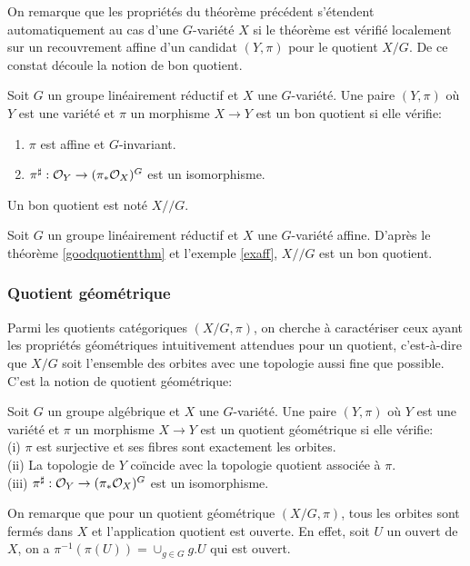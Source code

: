 On remarque que les propriétés du théorème précédent s'étendent automatiquement au cas d'une $G$-variété $X$ si le théorème est vérifié localement sur un recouvrement affine d'un candidat $(Y,\pi)$ pour le quotient $X/G$. De ce constat découle la notion de bon quotient.

\begin{defn}
Soit $G$ un groupe linéairement réductif et $X$ une $G$-variété. Une paire $(Y, \pi)$ où $Y$ est une variété et $\pi$ un morphisme $X\rightarrow Y$ est un bon quotient si elle vérifie:
\begin{enumerate}
\item $\pi$ est affine et $G$-invariant.
\item $\pi^\sharp:\mathcal{O}_Y \rightarrow (\pi_*\mathcal{O}_X)^G$ est un isomorphisme.
\end{enumerate}
Un bon quotient est noté $X//G$.
\end{defn}

\begin{ex}
Soit $G$ un groupe linéairement réductif et $X$ une $G$-variété affine. D'après le théorème \ref{goodquotientthm} et l'exemple \ref{exaff}, $X//G$ est un bon quotient.
\end{ex}


\subsubsection{Quotient géométrique}

Parmi les quotients catégoriques $(X/G,\pi)$, on cherche à caractériser ceux ayant les propriétés géométriques intuitivement attendues pour un quotient, c'est-à-dire que $X/G$ soit l'ensemble des orbites avec une topologie aussi fine que possible. C'est la notion de quotient géométrique:

\begin{defn}
Soit $G$ un groupe algébrique et $X$ une $G$-variété. Une paire $(Y, \pi)$ où $Y$ est une variété et $\pi$ un morphisme $X\rightarrow Y$ est un quotient géométrique si elle vérifie:\\
(i) $\pi$ est surjective et ses fibres sont exactement les orbites.\\
(ii) La topologie de $Y$ coïncide avec la topologie quotient associée à $\pi$.\\
(iii) $\pi^\sharp:\mathcal{O}_Y \rightarrow (\pi_*\mathcal{O}_X)^G$ est un isomorphisme.
\end{defn}

On remarque que pour un quotient géométrique $(X/G, \pi)$, tous les orbites sont fermés dans $X$ et l'application quotient est ouverte. En effet, soit $U$ un ouvert de $X$, on a $\pi^{-1}(\pi(U))=\cup_{g\in G}g.U$ qui est ouvert.


